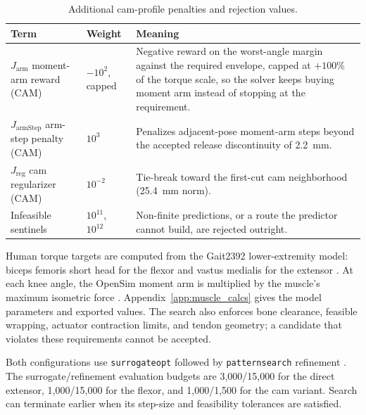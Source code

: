 \begin{table}[htbp]
\caption{Additional cam-profile penalties and rejection values.}\label{tab:mesh_cam_penalties}
\small\singlespacing
\begin{tabularx}{\textwidth}{@{}>{\raggedright\arraybackslash}p{}p{}>{\raggedright\arraybackslash}X@{}}
\toprule
\textbf{Term} & \textbf{Weight} & \textbf{Meaning} \\
\midrule
$J_{\text{arm}}$ moment-arm reward (CAM) & $-10^{2}$, capped & Negative reward on the worst-angle margin against the required envelope, capped at $+100\%$ of the torque scale, so the solver keeps buying moment arm instead of stopping at the requirement. \\
$J_{\text{armStep}}$ arm-step penalty (CAM) & $10^{3}$ & Penalizes adjacent-pose moment-arm steps beyond the accepted release discontinuity of \qty{2.2}{\mm}. \\
$J_{\text{reg}}$ cam regularizer (CAM) & $10^{-2}$ & Tie-break toward the first-cut cam neighborhood (\qty{25.4}{\mm} norm). \\
Infeasible sentinels & $10^{11}$, $10^{12}$ & Non-finite predictions, or a route the predictor cannot build, are rejected outright. \\
\bottomrule
\end{tabularx}
\end{table}

Human torque targets are computed from the Gait2392 lower-extremity model: biceps femoris short head for the flexor and vastus medialis for the extensor \citep{delp_opensim_2007,seth_opensim_2018}. At each knee angle, the OpenSim moment arm is multiplied by the muscle's maximum isometric force \citep{delp_interactive_1990,hoy_musculoskeletal_1990,sherman_what_2013}. Appendix~\ref{app:muscle_calcs} gives the model parameters and exported values. The search also enforces bone clearance, feasible wrapping, actuator contraction limits, and tendon geometry; a candidate that violates these requirements cannot be accepted.

Both configurations use \texttt{surrogateopt} followed by \texttt{patternsearch} refinement \citep{mathworks_optimization_2025,audet_mads_2006}. The surrogate/refinement evaluation budgets are 3,000/15,000 for the direct extensor, 1,000/15,000 for the flexor, and 1,000/1,500 for the cam variant. Search can terminate earlier when its step-size and feasibility tolerances are satisfied.

